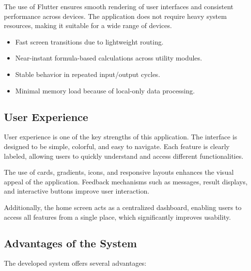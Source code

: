 \documentclass{article}
\begin{document}
The use of Flutter ensures smooth rendering of user interfaces and consistent performance across devices. The application does not require heavy system resources, making it suitable for a wide range of devices.

\begin{reportbox}
\begin{itemize}
\item Fast screen transitions due to lightweight routing.
\item Near-instant formula-based calculations across utility modules.
\item Stable behavior in repeated input/output cycles.
\item Minimal memory load because of local-only data processing.
\end{itemize}
\end{reportbox}

\subsection{User Experience}

User experience is one of the key strengths of this application. The interface is designed to be simple, colorful, and easy to navigate. Each feature is clearly labeled, allowing users to quickly understand and access different functionalities.

The use of cards, gradients, icons, and responsive layouts enhances the visual appeal of the application. Feedback mechanisms such as messages, result displays, and interactive buttons improve user interaction.

Additionally, the home screen acts as a centralized dashboard, enabling users to access all features from a single place, which significantly improves usability.

\subsection{Advantages of the System}

The developed system offers several advantages:
\end{document}

